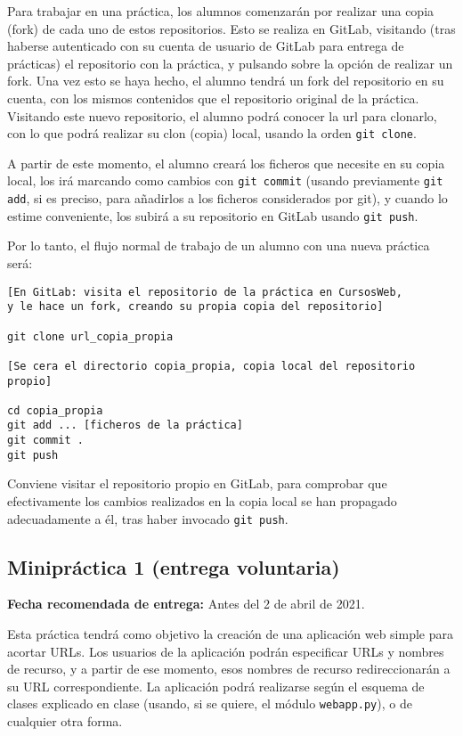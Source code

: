 Para trabajar en una práctica, los alumnos comenzarán por realizar una copia (fork) de cada uno de estos repositorios. Esto se realiza en GitLab, visitando (tras haberse autenticado con su cuenta de usuario de GitLab para entrega de prácticas) el repositorio con la práctica, y pulsando sobre la opción de realizar un fork. Una vez esto se haya hecho, el alumno tendrá un fork del repositorio en su cuenta, con los mismos contenidos que el repositorio original de la práctica. Visitando este nuevo repositorio, el alumno podrá conocer la url para clonarlo, con lo que podrá realizar su clon (copia) local, usando la orden \verb|git clone|.

A partir de este momento, el alumno creará los ficheros que necesite en su copia local, los irá marcando como cambios con \verb|git commit| (usando previamente \verb|git add|, si es preciso, para añadirlos a los ficheros considerados por git), y cuando lo estime conveniente, los subirá a su repositorio en GitLab usando \verb|git push|.

Por lo tanto, el flujo normal de trabajo de un alumno con una nueva práctica será:

\begin{verbatim}
[En GitLab: visita el repositorio de la práctica en CursosWeb,
y le hace un fork, creando su propia copia del repositorio]

git clone url_copia_propia

[Se cera el directorio copia_propia, copia local del repositorio propio]

cd copia_propia
git add ... [ficheros de la práctica]
git commit .
git push
\end{verbatim}

Conviene visitar el repositorio propio en GitLab, para comprobar que efectivamente los cambios realizados en la copia local se han propagado adecuadamente a él, tras haber invocado \verb|git push|.

\subsection{Minipráctica 1 (entrega voluntaria)}
\label{subsec:practica-vol-1-2016}

\textbf{Fecha recomendada de entrega:} Antes del 2 de abril de 2021.

Esta práctica tendrá como objetivo la creación de una aplicación web simple para acortar URLs. Los usuarios de la aplicación podrán especificar URLs y nombres de recurso, y a partir de ese momento, esos nombres de recurso redireccionarán a su URL correspondiente. La aplicación podrá realizarse según el esquema de clases explicado en clase (usando, si se quiere, el módulo \texttt{webapp.py}), o de cualquier otra forma.

